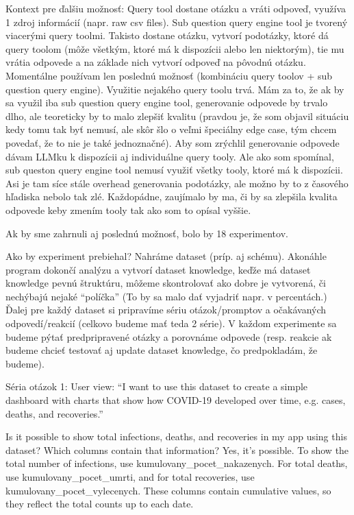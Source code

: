 Kontext pre ďalšiu možnosť:
Query tool dostane otázku a vráti odpoveď, využíva 1 zdroj informácií (napr. raw csv files).
Sub question query engine tool je tvorený viacerými query toolmi. Takisto dostane otázku, vytvorí podotázky, ktoré dá query toolom (môže všetkým, ktoré má k dispozícii alebo len niektorým), tie mu vrátia odpovede a na základe nich vytvorí odpoveď na pôvodnú otázku.
Momentálne používam len poslednú možnosť (kombináciu query toolov + sub question query engine). Využitie nejakého query toolu trvá. Mám za to, že ak by sa využil iba sub question query engine tool, generovanie odpovede by trvalo dlho, ale teoreticky by to malo zlepšiť kvalitu (pravdou je, že som objavil situáciu kedy tomu tak byť nemusí, ale skôr šlo o veľmi špeciálny edge case, tým chcem povedať, že to nie je také jednoznačné). Aby som zrýchlil generovanie odpovede dávam LLMku k dispozícii aj individuálne query tooly. Ale ako som spomínal, sub queston query engine tool nemusí využiť všetky tooly, ktoré má k dispozícii. Asi je tam síce stále overhead generovania podotázky, ale možno by to z časového hľadiska nebolo tak zlé. Každopádne, zaujímalo by ma, či by sa zlepšila kvalita odpovede keby zmením tooly tak ako som to opísal vyššie.

Ak by sme zahrnuli aj poslednú možnosť, bolo by 18 experimentov.

Ako by experiment prebiehal?
Nahráme dataset (príp. aj schému). Akonáhle program dokončí analýzu a vytvorí dataset knowledge, keďže má dataset knowledge pevnú štruktúru, môžeme skontrolovať ako dobre je vytvorená, či nechýbajú nejaké “políčka” (To by sa malo dať vyjadriť napr. v percentách.)
Ďalej pre každý dataset si pripravíme sériu otázok/promptov a očakávaných odpovedí/reakcií (celkovo budeme mať teda 2 série). V každom experimente sa budeme pýtať predpripravené otázky a porovnáme odpovede (resp. reakcie ak budeme chcieť testovať aj update dataset knowledge, čo predpokladám, že budeme).

Séria otázok 1:
User view: “I want to use this dataset to create a simple dashboard with charts that show how COVID-19 developed over time, e.g. cases, deaths, and recoveries.”

Is it possible to show total infections, deaths, and recoveries in my app using this dataset? Which columns contain that information?
Yes, it’s possible. To show the total number of infections, use kumulovany_pocet_nakazenych. For total deaths, use kumulovany_pocet_umrti, and for total recoveries, use kumulovany_pocet_vylecenych. These columns contain cumulative values, so they reflect the total counts up to each date.

